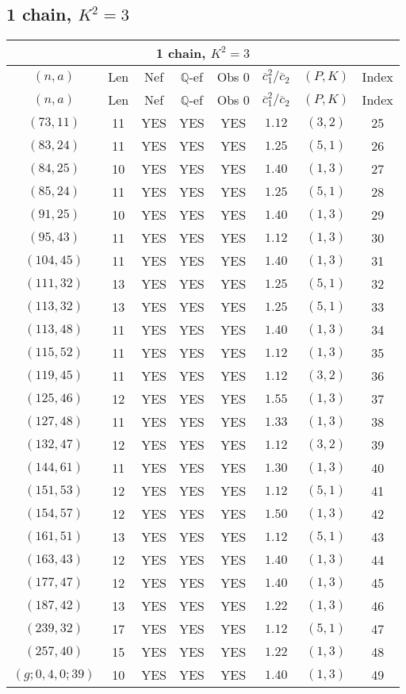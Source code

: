 \subsection{1 chain, $K^2 = 3$}
\begin{longtable}{|c|c|c|c|c|c|c|c|}
\hline
\multicolumn{8}{|c|}{1 chain, $K^2 = 3$}\\
\hline
$(n,a)$ & Len & Nef & $\mathbb Q$-ef & Obs 0 & $\overline c_1^2 / \overline c_2$ & $(P,K)$ & Index\\
\hline
\endfirsthead

\hline
$(n,a)$ & Len & Nef & $\mathbb Q$-ef & Obs 0 & $\overline c_1^2 / \overline c_2$ & $(P,K)$ & Index\\
\hline
\endhead
\hline
\endfoot

$(73,11)$ & 11 & YES & YES & YES & $1.12$ & $(3,2)$ & 25\\
$(83,24)$ & 11 & YES & YES & YES & $1.25$ & $(5,1)$ & 26\\
$(84,25)$ & 10 & YES & YES & YES & $1.40$ & $(1,3)$ & 27\\
$(85,24)$ & 11 & YES & YES & YES & $1.25$ & $(5,1)$ & 28\\
$(91,25)$ & 10 & YES & YES & YES & $1.40$ & $(1,3)$ & 29\\
$(95,43)$ & 11 & YES & YES & YES & $1.12$ & $(1,3)$ & 30\\
$(104,45)$ & 11 & YES & YES & YES & $1.40$ & $(1,3)$ & 31\\
$(111,32)$ & 13 & YES & YES & YES & $1.25$ & $(5,1)$ & 32\\
$(113,32)$ & 13 & YES & YES & YES & $1.25$ & $(5,1)$ & 33\\
$(113,48)$ & 11 & YES & YES & YES & $1.40$ & $(1,3)$ & 34\\
$(115,52)$ & 11 & YES & YES & YES & $1.12$ & $(1,3)$ & 35\\
$(119,45)$ & 11 & YES & YES & YES & $1.12$ & $(3,2)$ & 36\\
$(125,46)$ & 12 & YES & YES & YES & $1.55$ & $(1,3)$ & 37\\
$(127,48)$ & 11 & YES & YES & YES & $1.33$ & $(1,3)$ & 38\\
$(132,47)$ & 12 & YES & YES & YES & $1.12$ & $(3,2)$ & 39\\
$(144,61)$ & 11 & YES & YES & YES & $1.30$ & $(1,3)$ & 40\\
$(151,53)$ & 12 & YES & YES & YES & $1.12$ & $(5,1)$ & 41\\
$(154,57)$ & 12 & YES & YES & YES & $1.50$ & $(1,3)$ & 42\\
$(161,51)$ & 13 & YES & YES & YES & $1.12$ & $(5,1)$ & 43\\
$(163,43)$ & 12 & YES & YES & YES & $1.40$ & $(1,3)$ & 44\\
$(177,47)$ & 12 & YES & YES & YES & $1.40$ & $(1,3)$ & 45\\
$(187,42)$ & 13 & YES & YES & YES & $1.22$ & $(1,3)$ & 46\\
$(239,32)$ & 17 & YES & YES & YES & $1.12$ & $(5,1)$ & 47\\
$(257,40)$ & 15 & YES & YES & YES & $1.22$ & $(1,3)$ & 48\\
$(g;0,4,0;39)$ & 10 & YES & YES & YES & $1.40$ & $(1,3)$ & 49
\end{longtable}
